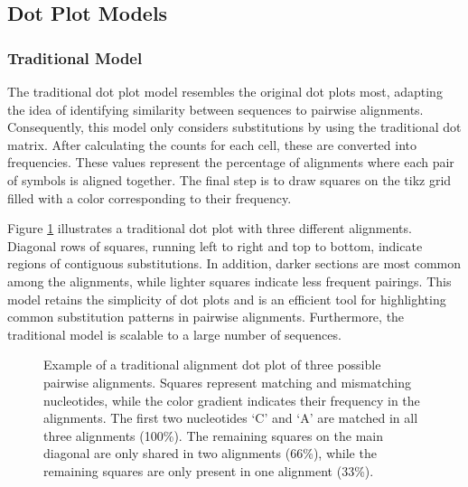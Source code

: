 \subsection{Dot Plot Models}

\subsubsection{Traditional Model}

The traditional dot plot model resembles the original dot plots most, adapting the idea of identifying similarity between sequences to pairwise alignments. Consequently, this model only considers substitutions by using the traditional dot matrix. After calculating the counts for each cell, these are converted into frequencies. These values represent the percentage of alignments where each pair of symbols is aligned together. The final step is to draw squares on the tikz grid filled with a color corresponding to their frequency.

Figure \ref{fig:traditional} illustrates a traditional dot plot with three different alignments.
Diagonal rows of squares, running left to right and top to bottom, indicate regions of contiguous substitutions. In addition, darker sections are most common among the alignments, while lighter squares indicate less frequent pairings. This model retains the simplicity of dot plots and is an efficient tool for highlighting common substitution patterns in pairwise alignments. Furthermore, the traditional model is scalable to a large number of sequences.
\begin{figure}[H]
    \centering
    \begin{subfigure}[c]{0.2\textwidth}
        \centering
        \hspace*{-2em}
        \vspace*{-1.5em}\caption{}
     \end{subfigure}
     \hspace{6em}
    \begin{subfigure}[c]{0.5\textwidth}
        \centering
        \resizebox{1.15\textwidth}{!}{}
        \caption{}
     \end{subfigure}
    \caption[Traditional Dot Plot Model]{Example of a traditional alignment dot plot of three possible pairwise alignments. Squares represent matching and mismatching nucleotides, while the color gradient indicates their frequency in the alignments. The first two nucleotides `C' and `A' are matched in all three alignments (100\%). The remaining squares on the main diagonal are only shared in two alignments (66\%), while the remaining squares are only present in one alignment (33\%).}
    \label{fig:traditional}
\end{figure}


